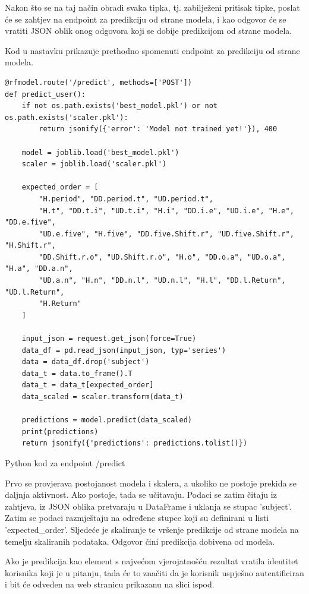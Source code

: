 \documentclass[]{foi}
\begin{document}
Nakon što se na taj način obradi svaka tipka, tj. zabilježeni pritisak tipke, poslat će se zahtjev na endpoint za predikciju od strane modela, i kao odgovor će se vratiti JSON oblik onog odgovora koji se dobije predikcijom od strane modela.

Kod u nastavku prikazuje prethodno spomenuti endpoint za predikciju od strane modela.

\begin{listing}
\begin{verbatim}
@rfmodel.route('/predict', methods=['POST'])
def predict_user():
    if not os.path.exists('best_model.pkl') or not os.path.exists('scaler.pkl'):
        return jsonify({'error': 'Model not trained yet!'}), 400

    model = joblib.load('best_model.pkl')
    scaler = joblib.load('scaler.pkl')

    expected_order = [
        "H.period", "DD.period.t", "UD.period.t", 
        "H.t", "DD.t.i", "UD.t.i", "H.i", "DD.i.e", "UD.i.e", "H.e", "DD.e.five", 
        "UD.e.five", "H.five", "DD.five.Shift.r", "UD.five.Shift.r", "H.Shift.r", 
        "DD.Shift.r.o", "UD.Shift.r.o", "H.o", "DD.o.a", "UD.o.a", "H.a", "DD.a.n", 
        "UD.a.n", "H.n", "DD.n.l", "UD.n.l", "H.l", "DD.l.Return", "UD.l.Return", 
        "H.Return"
    ]

    input_json = request.get_json(force=True) 
    data_df = pd.read_json(input_json, typ='series')
    data = data_df.drop('subject')
    data_t = data.to_frame().T
    data_t = data_t[expected_order]
    data_scaled = scaler.transform(data_t)

    predictions = model.predict(data_scaled)
    print(predictions)
    return jsonify({'predictions': predictions.tolist()})
\end{verbatim}
\caption{Python kod za endpoint /predict}
\label{lst:python_predict}
\end{listing}

Prvo se provjerava postojanost modela i skalera, a ukoliko ne postoje prekida se daljnja aktivnost. Ako postoje, tada se učitavaju. Podaci se zatim čitaju iz zahtjeva, iz JSON oblika pretvaraju u DataFrame i uklanja se stupac 'subject'. Zatim se podaci razmještaju na određene stupce koji su definirani u listi 'expected\_order'. Sljedeće je skaliranje te vršenje predikcije od strane modela na temelju skaliranih podataka. Odgovor čini predikcija dobivena od modela.

Ako je predikcija kao element s najvećom vjerojatnošću rezultat vratila identitet korisnika koji je u pitanju, tada će to značiti da je korisnik uspješno autentificiran i bit će odveden na web stranicu prikazanu na slici ispod.
\end{document}

